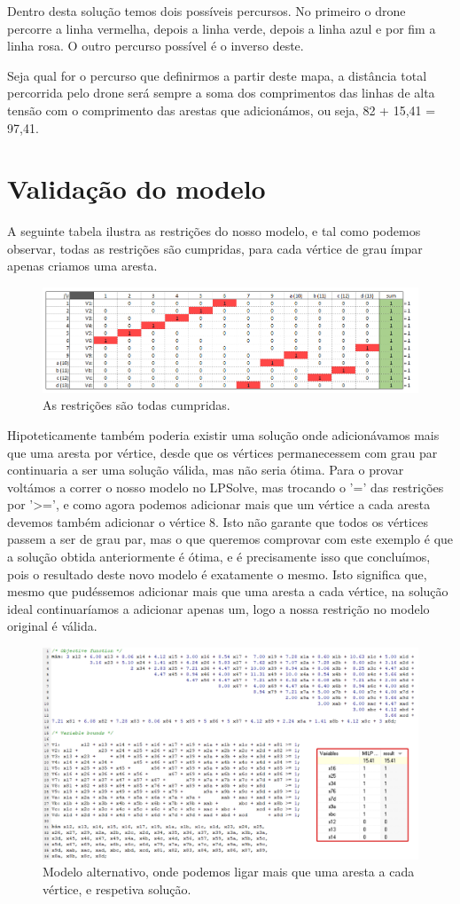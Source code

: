 \documentclass{article}
\begin{document}
Dentro desta solução temos dois possíveis percursos. No primeiro o drone percorre a linha vermelha, depois a linha verde, depois a linha azul e por fim a linha rosa. O outro percurso possível é o inverso deste.

Seja qual for o percurso que definirmos a partir deste mapa, a distância total percorrida pelo drone será sempre a soma dos comprimentos das linhas de alta tensão com o comprimento das arestas que adicionámos, ou seja, 82 + 15,41 = 97,41.

\section{Validação do modelo}

A seguinte tabela ilustra as restrições do nosso modelo, e tal como podemos observar, todas as restrições são cumpridas, para cada vértice de grau ímpar apenas criamos uma aresta. 

\begin{figure}[H]
    \centering
    \includegraphics[width=0.8\linewidth]{fig6.png}
    \caption{As restrições são todas cumpridas.}
    \label{fig:restricoes}
\end{figure}

Hipoteticamente também poderia existir uma solução onde adicionávamos mais que uma aresta por vértice, desde que os vértices permanecessem com grau par continuaria a ser uma solução válida, mas não seria ótima. Para o provar voltámos a correr o nosso modelo no LPSolve, mas trocando o '=' das restrições por '>=', e como agora podemos adicionar mais que um vértice a cada aresta devemos também adicionar o vértice 8. Isto não garante que todos os vértices passem a ser de grau par, mas o que queremos comprovar com este exemplo é que a solução obtida anteriormente é ótima, e é precisamente isso que concluímos, pois o resultado deste novo modelo é exatamente o mesmo. Isto significa que, mesmo que pudéssemos adicionar mais que uma aresta a cada vértice, na solução ideal continuaríamos a adicionar apenas um, logo a nossa restrição no modelo original é válida.

\begin{figure}[H]
    \centering
    \includegraphics[width=0.9\linewidth]{fig7.png}
    \caption{Modelo alternativo, onde podemos ligar mais que uma aresta a cada vértice, e respetiva solução.}
    \label{fig:altmodelo}
\end{figure}
\end{document}
